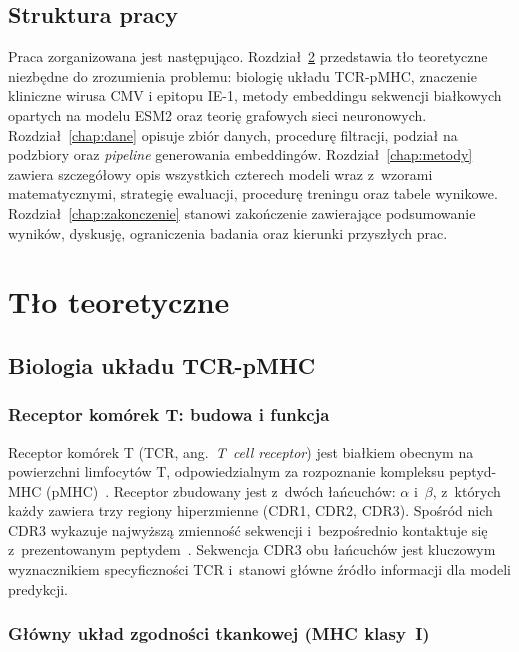 \documentclass{SGGW-thesis}
\begin{document}
\section{Struktura pracy}

Praca zorganizowana jest następująco. Rozdział~\ref{chap:tlo} przedstawia tło teoretyczne niezbędne
do zrozumienia problemu: biologię układu TCR-pMHC, znaczenie kliniczne wirusa CMV i epitopu IE-1,
metody embeddingu sekwencji białkowych opartych na modelu ESM2 oraz teorię grafowych sieci
neuronowych. Rozdział~\ref{chap:dane} opisuje zbiór danych, procedurę filtracji, podział na podzbiory
oraz \textit{pipeline} generowania embeddingów. Rozdział~\ref{chap:metody} zawiera szczegółowy opis
wszystkich czterech modeli wraz z~wzorami matematycznymi, strategię ewaluacji, procedurę treningu
oraz tabele wynikowe. Rozdział~\ref{chap:zakonczenie}
stanowi zakończenie zawierające podsumowanie wyników, dyskusję, ograniczenia badania oraz kierunki
przyszłych prac.


\chapter{Tło teoretyczne}
\label{chap:tlo}

\section{Biologia układu TCR-pMHC}

\subsection{Receptor komórek T: budowa i funkcja}

Receptor komórek T (TCR, ang.\ \textit{T~cell receptor}) jest białkiem obecnym na powierzchni
limfocytów T, odpowiedzialnym za rozpoznanie kompleksu peptyd-MHC (pMHC)~\cite{janeway2017}.
Receptor zbudowany jest z~dwóch łańcuchów: $\alpha$ i~$\beta$, z~których każdy zawiera trzy
regiony hiperzmienne (CDR1, CDR2, CDR3). Spośród nich CDR3 wykazuje najwyższą zmienność sekwencji
i~bezpośrednio kontaktuje się z~prezentowanym peptydem~\cite{janeway2017}.
Sekwencja CDR3 obu łańcuchów jest kluczowym wyznacznikiem specyficzności TCR i~stanowi
główne źródło informacji dla modeli predykcji.

\subsection{Główny układ zgodności tkankowej (MHC klasy~I)}
\end{document}
